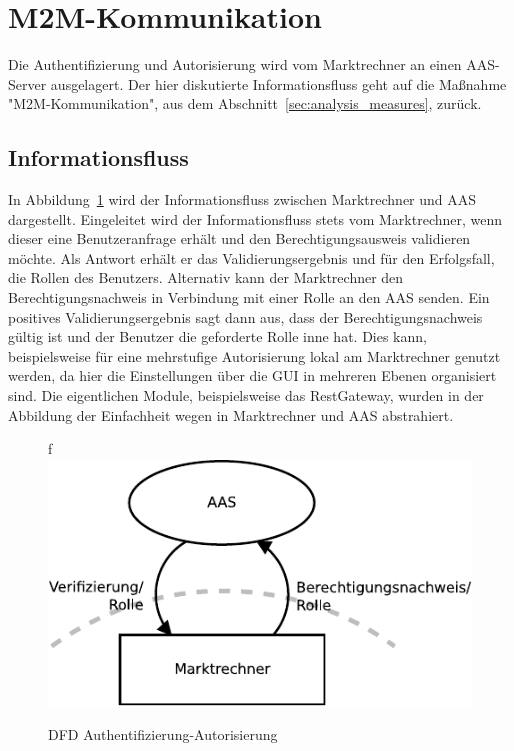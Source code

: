\documentclass[11pt,a4paper]{report}
\begin{document}
\section{M2M-Kommunikation} \label{sec:model_auth}

Die Authentifizierung und Autorisierung wird vom Marktrechner an einen AAS-Server ausgelagert. Der hier diskutierte Informationsfluss geht auf die Maßnahme "M2M-Kommunikation", aus dem Abschnitt~\ref{sec:analysis_measures}, zurück.

\subsection{Informationsfluss}

In Abbildung~\ref{fig:dfd_auth} wird der Informationsfluss zwischen Marktrechner und AAS dargestellt. Eingeleitet wird der Informationsfluss stets vom Marktrechner, wenn dieser eine Benutzeranfrage erhält und den Berechtigungsausweis validieren möchte. Als Antwort erhält er das Validierungsergebnis und für den Erfolgsfall, die Rollen des Benutzers. Alternativ kann der Marktrechner den Berechtigungsnachweis in Verbindung mit einer Rolle an den AAS senden. Ein positives Validierungsergebnis sagt dann aus, dass der Berechtigungsnachweis gültig ist und der Benutzer die geforderte Rolle inne hat. Dies kann, beispielsweise für eine mehrstufige Autorisierung lokal am Marktrechner genutzt werden, da hier die Einstellungen über die GUI in mehreren Ebenen organisiert sind. Die eigentlichen Module, beispielsweise das RestGateway, wurden in der Abbildung der Einfachheit wegen in Marktrechner und AAS abstrahiert.

\begin{figure}[htbp]f
\centering
\includegraphics[scale=1.1]{images/dfd_auth.pdf}
\caption{DFD Authentifizierung-Autorisierung}
\label{fig:dfd_auth}
\end{figure}
\end{document}
